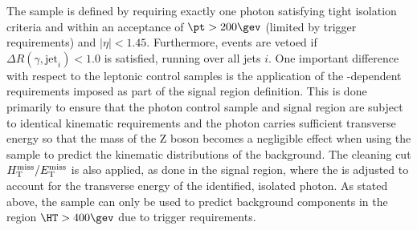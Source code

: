 The \gj sample is defined by requiring exactly one photon satisfying
tight isolation criteria and within an acceptance of $\pt > 200\gev$
(limited by trigger requirements) and $|\eta| < 1.45$. Furthermore,
events are vetoed if $\Delta R(\gamma,\textrm{jet}_i) < 1.0$ is
satisfied, running over all jets $i$. One important difference with
respect to the leptonic control samples is the application of the
\HT-dependent \alphat requirements imposed as part of the signal
region definition. This is done primarily to ensure that the photon
control sample and signal region are subject to identical kinematic
requirements and the photon carries sufficient transverse energy so
that the mass of the Z boson becomes a negligible effect when using
the \gj sample to predict the kinematic distributions of the \znunu
background. The cleaning cut $\mbox{$H_{\rm T}^{\rm miss}$}/\mbox{$E_\text{T}^{\rm miss}$}$ is also applied, as done in
the signal region, where the \met is adjusted to account for the
transverse energy of the identified, isolated photon. As stated above,
the \gj sample can only be used to predict background components in
the region $\HT > 400\gev$ due to trigger requirements.
